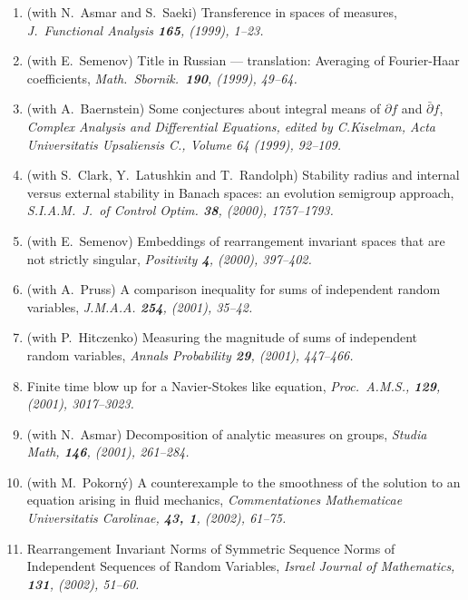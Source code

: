 \documentclass{article}
\newcommand{\littlesection}[1]{\section*{\normalsize\bf #1}}
\begin{document}
\begin{enumerate}
{Contemporary Mathematics 234, A.M.S., Providence R.I., 1999.}
\item (with N.~Asmar and S.~Saeki) Transference in spaces of measures,
{\em J.\ Functional Analysis {\bf 165}, (1999), 1--23.}
\item (with E.~Semenov) Title in Russian --- translation:
Averaging of Fourier-Haar coefficients,
{\em Math.\ Sbornik.\ {\bf 190}, (1999), 49--64.}
\item (with A.~Baernstein) Some conjectures about integral means
of $\partial f$ and $\bar\partial f$,
{\em Complex Analysis and Differential Equations, edited by C.Kiselman, Acta
Universitatis Upsaliensis C., Volume 64 (1999), 92--109.}
\item (with S.~Clark, Y.~Latushkin and T.~Randolph)
Stability radius and internal versus external stability in Banach spaces:
an evolution semigroup approach, {\em S.I.A.M.\ J.\ of
Control Optim. {\bf 38}, (2000), 1757--1793.}
\item (with E.~Semenov) Embeddings of rearrangement invariant spaces
that are not strictly singular, {\em Positivity {\bf 4}, (2000), 397--402.}
\item (with A.~Pruss) A comparison inequality for sums of independent
random variables, {\em J.M.A.A. {\bf 254}, (2001), 35--42.}
\item (with P.~Hitczenko) Measuring the magnitude of sums of independent
random variables, {\em Annals Probability {\bf 29}, (2001), 447--466.}
\item Finite time blow up for a Navier-Stokes like equation,
{\em Proc.\ A.M.S., {\bf 129}, (2001), 3017--3023.}
\item (with N.~Asmar) Decomposition of analytic measures on groups,
{\em Studia Math, {\bf 146}, (2001), 261--284.}
\item (with M.~Pokorn\'y) A counterexample to the smoothness of the solution
to an equation arising in fluid mechanics, {\em
Commentationes Mathematicae Universitatis Carolinae, {\bf 43, 1}, (2002),
61--75.}
\item Rearrangement Invariant Norms of Symmetric Sequence Norms of
Independent Sequences of Random Variables, {\em Israel Journal
of Mathematics, {\bf 131}, (2002), 51--60.}
\end{enumerate}


\end{document}
